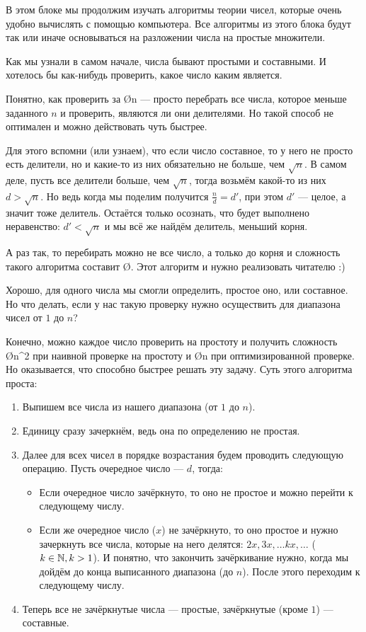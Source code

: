В этом блоке мы продолжим изучать алгоритмы теории чисел, которые очень удобно вычислять с помощью компьютера. Все алгоритмы из этого блока будут так или иначе основываться на разложении числа на простые множители.


Как мы узнали в самом начале, числа бывают простыми и составными. И хотелось бы как-нибудь проверить, какое число каким является.

Понятно, как проверить за \O{n} — просто перебрать все числа, которое меньше заданного $n$ и проверить, являются ли они делителями. Но такой способ не оптимален и можно действовать чуть быстрее.

Для этого вспомни (или узнаем), что если число составное, то у него не просто есть делители, но и какие-то из них обязательно не больше, чем $\sqrt{n}$. В самом деле, пусть все делители больше, чем $\sqrt{n}$, тогда возьмём какой-то из них $d > \sqrt{n}$. Но ведь когда мы поделим получится $\frac{n}{d} = d'$, при этом $d'$ — целое, а значит тоже делитель. Остаётся только осознать, что будет выполнено неравенство: $d' < \sqrt{n}$ и мы всё же найдём делитель, меньший корня.

А раз так, то перебирать можно не все число, а только до корня и сложность такого алгоритма составит \O{}. Этот алгоритм и нужно реализовать читателю :)


Хорошо, для одного числа мы смогли определить, простое оно, или составное. Но что делать, если у нас такую проверку нужно осуществить для диапазона чисел от $1$ до $n$?

Конечно, можно каждое число проверить на простоту и получить сложность \O{n^2} при наивной проверке на простоту и \O{n} при оптимизированной проверке. Но оказывается, что  способно быстрее решать эту задачу. Суть этого алгоритма проста:

\begin{enumerate}
    \item Выпишем все числа из нашего диапазона (от $1$ до $n$).
    \item Единицу сразу зачеркнём, ведь она по определению не простая.
    \item Далее для всех чисел в порядке возрастания будем проводить следующую операцию. Пусть очередное число — $d$, тогда:
        \begin{itemize}
            \item Если очередное число зачёркнуто, то оно не простое и можно перейти к следующему числу.
            \item Если же очередное число ($x$) не зачёркнуто, то оно простое и нужно зачеркнуть все числа, которые на него делятся: $2x, 3x, \ldots kx, \ldots$ ($k \in \mathbb{N}, k > 1$). И понятно, что закончить зачёркивание нужно, когда мы дойдём до конца выписанного диапазона (до $n$). После этого переходим к следующему числу.
        \end{itemize}
    \item Теперь все не зачёркнутые числа — простые, зачёркнутые (кроме $1$) — составные.
\end{enumerate}

